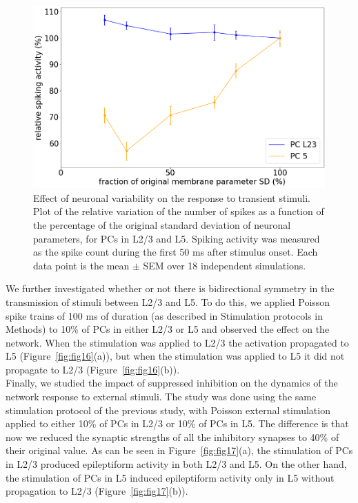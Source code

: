 \begin{figure}[H]
    \centering
    \includegraphics[scale=0.25]{Figures/Fig15.png}
    \caption{Effect of neuronal variability on the response to transient stimuli. Plot of the relative variation of the number of spikes as a function of the percentage of the original standard deviation of neuronal parameters, for PCs in L2/3 and L5. Spiking activity was measured as the spike count during the first 50 ms after stimulus onset. Each data point is the mean $\pm$ SEM over 18 independent simulations.}
    \label{fig:fig15}
\end{figure}

We further investigated whether or not there is bidirectional symmetry in the transmission of stimuli between L2/3 and L5. To do this, we applied Poisson spike trains of 100 ms of duration (as described in Stimulation protocols in Methods) to 10\% of PCs in either L2/3 or L5 and observed the effect on the network. When the stimulation was applied to L2/3 the activation propagated to L5 (Figure~\ref{fig:fig16}(a)), but when the stimulation was applied to L5 it did not propagate to L2/3 (Figure~\ref{fig:fig16}(b)).\\  

Finally, we studied the impact of suppressed inhibition on the dynamics of the network response to external stimuli. The study was done using the same stimulation protocol of the previous study, with Poisson external stimulation applied to either 10\% of PCs in L2/3 or 10\% of PCs in L5. The difference is that now we reduced the synaptic strengths of all the inhibitory synapses to 40\% of their original value. As can be seen in Figure~\ref{fig:fig17}(a), the stimulation of PCs in L2/3 produced epileptiform activity in both L2/3 and L5. On the other hand, the stimulation of PCs in L5 induced epileptiform activity only in L5 without propagation to L2/3 (Figure~\ref{fig:fig17}(b)).


